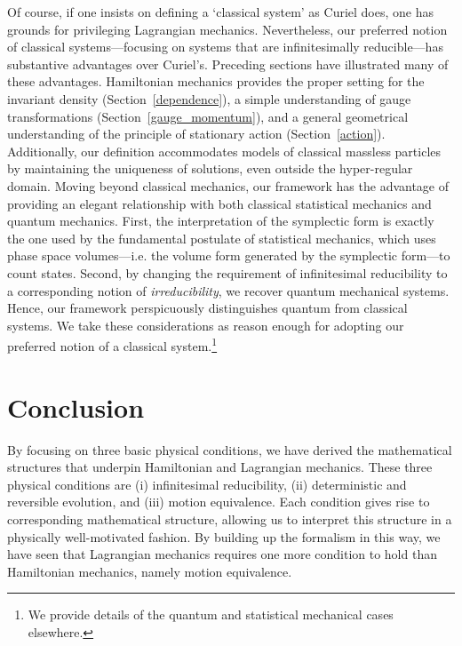 \documentclass[12pt, english, twoside]{article} %
\begin{document}
Of course, if one insists on defining a `classical system' as Curiel does, one has grounds for privileging Lagrangian mechanics. Nevertheless, our preferred notion of classical systems---focusing on systems that are infinitesimally reducible---has substantive advantages over Curiel's. Preceding sections have illustrated many of these advantages. Hamiltonian mechanics provides the proper setting for the invariant density (Section~\ref{dependence}), a simple understanding of gauge transformations (Section~\ref{gauge_momentum}), and a general geometrical understanding of the principle of stationary action (Section~\ref{action}). Additionally, our definition accommodates models of classical massless particles by maintaining the uniqueness of solutions, even outside the hyper-regular domain. Moving beyond classical mechanics, our framework has the advantage of providing an elegant relationship with both classical statistical mechanics and quantum mechanics. First, the interpretation of the symplectic form is exactly the one used by the fundamental postulate of statistical mechanics, which uses phase space volumes---i.e. the volume form generated by the symplectic form---to count states. Second, by changing the requirement of infinitesimal reducibility to a corresponding notion of \textit{irreducibility}, we recover quantum mechanical systems. Hence, our framework perspicuously distinguishes quantum from classical systems. We take these considerations as reason enough for adopting our preferred notion of a classical system.\footnote{We provide details of the quantum and statistical mechanical cases elsewhere.}  


\section{Conclusion}
\label{conclusion}

By focusing on three basic physical conditions, we have derived the mathematical structures that underpin Hamiltonian and Lagrangian mechanics. These three physical conditions are (i) infinitesimal reducibility, (ii) deterministic and reversible evolution, and (iii) motion equivalence. Each condition gives rise to corresponding mathematical structure, allowing us to interpret this structure in a physically well-motivated fashion. By building up the formalism in this way, we have seen that Lagrangian mechanics requires one more condition to hold than Hamiltonian mechanics, namely motion equivalence.
\end{document}
